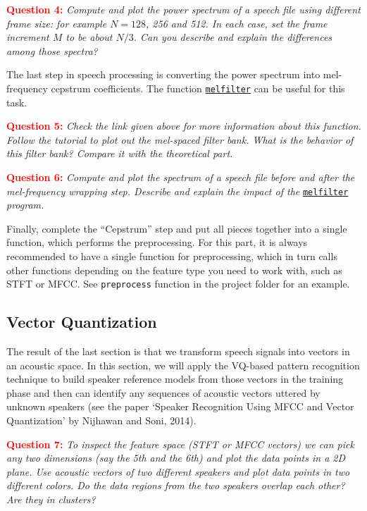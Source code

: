 \documentclass{article}
\begin{document}
\textcolor{red}{\textbf{Question 4:}} \textit{Compute and plot the power spectrum of a speech file using different frame size: for example $N = 128$, 256 and 512.  In each case, set the frame increment $M$ to be about $N/3$.  Can you describe and explain the differences among those spectra?}

The last step in speech processing is converting the power spectrum into mel-frequency cepstrum coefficients. The function \href{https://pytorch.org/audio/main/tutorials/audio_feature_extractions_tutorial.html#mel-filter-bank}{\texttt{melfilter}} can be useful for this task.

\textcolor{red}{\textbf{Question 5:}} \textit{Check the link given above for more information about this function.  Follow the tutorial to plot out the mel-spaced filter bank. What is the behavior of this filter bank?  Compare it with the theoretical part.}

\textcolor{red}{\textbf{Question 6:}} \textit{Compute and plot the spectrum of a speech file before and after the mel-frequency wrapping step.  Describe and explain the impact of the} \href{https://pytorch.org/audio/main/tutorials/audio_feature_extractions_tutorial.html#mel-filter-bank}{\texttt{melfilter}} \textit{program.}

Finally, complete the “Cepstrum” step and put all pieces together into a single function, which performs the preprocessing. For this part, it is always recommended to have a single function for preprocessing, which in turn calls other functions depending on the feature type you need to work with, such as STFT or MFCC. See \texttt{preprocess} function in the project folder for an example.

\subsection{Vector Quantization}
The result of the last section is that we transform speech signals into vectors in an acoustic space.  In this section, we will apply the VQ-based pattern recognition technique to build speaker reference models from those vectors in the training phase and then can identify any sequences of acoustic vectors uttered by unknown speakers (see the paper ‘Speaker Recognition Using MFCC and Vector Quantization’ by Nijhawan and Soni, 2014).

\textcolor{red}{\textbf{Question 7:}} \textit{To inspect the feature space (STFT or MFCC vectors) we can pick any two dimensions (say the 5th and the 6th) and plot the data points in a 2D plane.  Use acoustic vectors of two different speakers and plot data points in two different colors.  Do the data regions from the two speakers overlap each other?  Are they in clusters?}
\end{document}
